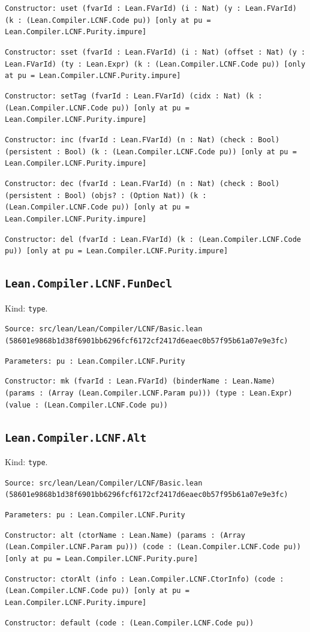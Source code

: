 \documentclass[11pt]{article}
\begin{document}
\noindent \texttt{Constructor: uset (fvarId : Lean.FVarId) (i : Nat) (y : Lean.FVarId) (k : (Lean.Compiler.LCNF.Code pu)) [only at pu = Lean.Compiler.LCNF.Purity.impure]}\par
\noindent \texttt{Constructor: sset (fvarId : Lean.FVarId) (i : Nat) (offset : Nat) (y : Lean.FVarId) (ty : Lean.Expr) (k : (Lean.Compiler.LCNF.Code pu)) [only at pu = Lean.Compiler.LCNF.Purity.impure]}\par
\noindent \texttt{Constructor: setTag (fvarId : Lean.FVarId) (cidx : Nat) (k : (Lean.Compiler.LCNF.Code pu)) [only at pu = Lean.Compiler.LCNF.Purity.impure]}\par
\noindent \texttt{Constructor: inc (fvarId : Lean.FVarId) (n : Nat) (check : Bool) (persistent : Bool) (k : (Lean.Compiler.LCNF.Code pu)) [only at pu = Lean.Compiler.LCNF.Purity.impure]}\par
\noindent \texttt{Constructor: dec (fvarId : Lean.FVarId) (n : Nat) (check : Bool) (persistent : Bool) (objs? : (Option Nat)) (k : (Lean.Compiler.LCNF.Code pu)) [only at pu = Lean.Compiler.LCNF.Purity.impure]}\par
\noindent \texttt{Constructor: del (fvarId : Lean.FVarId) (k : (Lean.Compiler.LCNF.Code pu)) [only at pu = Lean.Compiler.LCNF.Purity.impure]}\par
\subsection*{\texttt{Lean.Compiler.LCNF.FunDecl}}
\noindent Kind: \texttt{type}.\par
\noindent \texttt{Source: src/lean/Lean/Compiler/LCNF/Basic.lean (58601e9868b1d38f6901bb6296fcf6172cf2417d6eaec0b57f95b61a07e9e3fc)}\par
\noindent \texttt{Parameters: pu : Lean.Compiler.LCNF.Purity}\par
\noindent \texttt{Constructor: mk (fvarId : Lean.FVarId) (binderName : Lean.Name) (params : (Array (Lean.Compiler.LCNF.Param pu))) (type : Lean.Expr) (value : (Lean.Compiler.LCNF.Code pu))}\par
\subsection*{\texttt{Lean.Compiler.LCNF.Alt}}
\noindent Kind: \texttt{type}.\par
\noindent \texttt{Source: src/lean/Lean/Compiler/LCNF/Basic.lean (58601e9868b1d38f6901bb6296fcf6172cf2417d6eaec0b57f95b61a07e9e3fc)}\par
\noindent \texttt{Parameters: pu : Lean.Compiler.LCNF.Purity}\par
\noindent \texttt{Constructor: alt (ctorName : Lean.Name) (params : (Array (Lean.Compiler.LCNF.Param pu))) (code : (Lean.Compiler.LCNF.Code pu)) [only at pu = Lean.Compiler.LCNF.Purity.pure]}\par
\noindent \texttt{Constructor: ctorAlt (info : Lean.Compiler.LCNF.CtorInfo) (code : (Lean.Compiler.LCNF.Code pu)) [only at pu = Lean.Compiler.LCNF.Purity.impure]}\par
\noindent \texttt{Constructor: default (code : (Lean.Compiler.LCNF.Code pu))}\par
\end{document}
